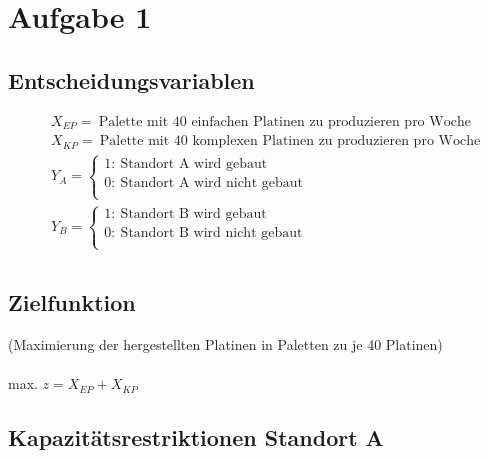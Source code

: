 \documentclass[a4paper,11pt]{article}
\begin{document}
\raggedright %

\section*{Aufgabe 1}

\subsection*{Entscheidungsvariablen}

\begin{align*}
& X_{EP} = ~\text{Palette mit 40 einfachen Platinen zu produzieren pro Woche} \\
& X_{KP} = ~\text{Palette mit 40 komplexen Platinen zu produzieren pro Woche} \\
& Y_A = \left\{\begin{array}{l}
            1: ~\text{Standort A wird gebaut} \\
            0: ~\text{Standort A wird nicht gebaut} \\
          \end{array}\right. \\
%
&Y_B = \left\{\begin{array}{l}
            1: ~\text{Standort B wird gebaut} \\
            0: ~\text{Standort B wird nicht gebaut} \\
          \end{array}\right. \\
\end{align*}

\subsection*{Zielfunktion}
(Maximierung der hergestellten Platinen in Paletten zu je 40 Platinen) \\~\\

max. $z  = X_{EP} + X_{KP}$ \\

\subsection*{Kapazitätsrestriktionen Standort A}
\end{document}
